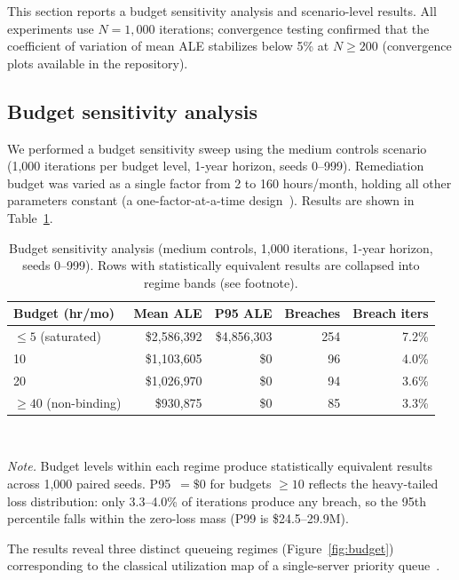 \documentclass[11pt,a4paper]{article}
\begin{document}
This section reports a budget sensitivity analysis and scenario-level results. All experiments use $N=1{,}000$ iterations; convergence testing confirmed that the coefficient of variation of mean ALE stabilizes below 5\% at $N \geq 200$ (convergence plots available in the repository).

\subsection{Budget sensitivity analysis}

We performed a budget sensitivity sweep using the medium controls scenario (1{,}000 iterations per budget level, 1-year horizon, seeds 0--999). Remediation budget was varied as a single factor from 2 to 160 hours/month, holding all other parameters constant (a one-factor-at-a-time design~\citep{Montgomery2017}). Results are shown in Table~\ref{tab:budget}.

\begin{table}[htbp]
\centering
\caption{Budget sensitivity analysis (medium controls, 1{,}000 iterations, 1-year horizon, seeds 0--999). Rows with statistically equivalent results are collapsed into regime bands (see footnote).}
\label{tab:budget}
\footnotesize
\begin{tabular}{l r r r r}
\toprule
\textbf{Budget (hr/mo)} & \textbf{Mean ALE} & \textbf{P95 ALE} & \textbf{Breaches} & \textbf{Breach iters} \\
\midrule
$\leq 5$ (saturated)       & \$2{,}586{,}392 & \$4{,}856{,}303 & 254 & 7.2\% \\
10                          & \$1{,}103{,}605  & \$0         & 96  & 4.0\% \\
20                          & \$1{,}026{,}970  & \$0         & 94  & 3.6\% \\
$\geq 40$ (non-binding)    & \$930{,}875  & \$0         & 85  & 3.3\% \\
\bottomrule
\end{tabular}
\\[0.5em]
\footnotesize\raggedright
\textit{Note.} Budget levels within each regime produce statistically equivalent results across 1{,}000 paired seeds. P95~$=\$0$ for budgets $\geq 10$ reflects the heavy-tailed loss distribution: only 3.3--4.0\% of iterations produce any breach, so the 95th percentile falls within the zero-loss mass (P99 is \$24.5--29.9M).
\end{table}

The results reveal three distinct queueing regimes (Figure~\ref{fig:budget}) corresponding to the classical utilization map of a single-server priority queue~\citep{Little1961, Kleinrock1975}.
\end{document}
